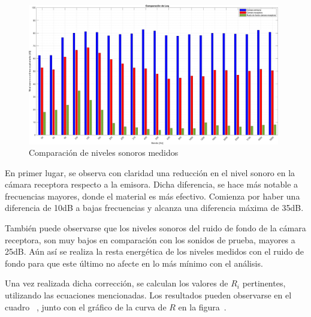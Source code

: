 
\begin{figure}[H]
	\centering
	\includegraphics[width=0.98\textwidth]{./img/Comparacion_Leq_bars.png}
	\caption{Comparación de niveles sonoros medidos}
	\label{fig::comparacion_niveles_sonoros}
\end{figure}


\par En primer lugar, se observa con claridad una reducción en el nivel sonoro en la cámara receptora respecto a la emisora. Dicha diferencia, se hace más notable a frecuencias mayores, donde el material es más efectivo. Comienza por haber una diferencia de 10dB a bajas frecuencias y alcanza una diferencia máxima de 35dB. 


\par También puede observarse que los niveles sonoros del ruido de fondo de la cámara receptora, son muy bajos en comparación con los sonidos de prueba, mayores  a 25dB. Aún así se realiza la resta energética de los niveles medidos con el ruido de fondo para que este último no afecte en lo más mínimo con el análisis.\\

\par Una vez realizada dicha corrección, se calculan los valores de $R_i$ pertinentes, utilizando las ecuaciones mencionadas. Los resultados pueden observarse en el cuadro~ , junto con el gráfico de la curva de $R$ en la figura~.



